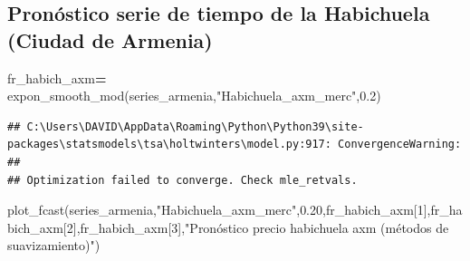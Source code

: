 \documentclass[
]{book}
\newenvironment{Shaded}{\begin{snugshade}}{\end{snugshade}}
\newcommand{\DecValTok}[1]{\textcolor[rgb]{0.00,0.00,0.81}{#1}}
\newcommand{\FloatTok}[1]{\textcolor[rgb]{0.00,0.00,0.81}{#1}}
\newcommand{\NormalTok}[1]{#1}
\newcommand{\OperatorTok}[1]{\textcolor[rgb]{0.81,0.36,0.00}{\textbf{#1}}}
\newcommand{\StringTok}[1]{\textcolor[rgb]{0.31,0.60,0.02}{#1}}
\begin{document}
\hypertarget{pronuxf3stico-serie-de-tiempo-de-la-habichuela-ciudad-de-armenia}{%
\subsection{Pronóstico serie de tiempo de la Habichuela (Ciudad de Armenia)}\label{pronuxf3stico-serie-de-tiempo-de-la-habichuela-ciudad-de-armenia}}

\begin{Shaded}
\begin{Highlighting}[]

\NormalTok{fr\_habich\_axm}\OperatorTok{=}\NormalTok{ expon\_smooth\_mod(series\_armenia,}\StringTok{"Habichuela\_axm\_merc"}\NormalTok{,}\FloatTok{0.2}\NormalTok{)}
\end{Highlighting}
\end{Shaded}

\begin{verbatim}
## C:\Users\DAVID\AppData\Roaming\Python\Python39\site-packages\statsmodels\tsa\holtwinters\model.py:917: ConvergenceWarning:
## 
## Optimization failed to converge. Check mle_retvals.
\end{verbatim}

\begin{Shaded}
\begin{Highlighting}[]
\NormalTok{plot\_fcast(series\_armenia,}\StringTok{"Habichuela\_axm\_merc"}\NormalTok{,}\FloatTok{0.20}\NormalTok{,fr\_habich\_axm[}\DecValTok{1}\NormalTok{],fr\_habich\_axm[}\DecValTok{2}\NormalTok{],fr\_habich\_axm[}\DecValTok{3}\NormalTok{],}\StringTok{"Pronóstico precio habichuela axm (métodos de suavizamiento)"}\NormalTok{)}
\end{Highlighting}
\end{Shaded}
\end{document}
